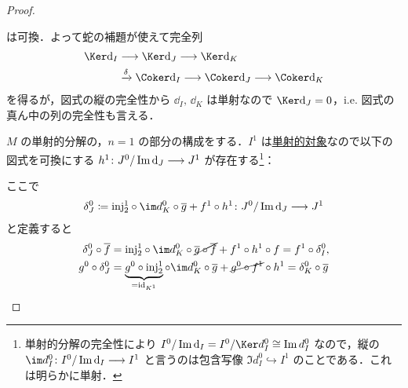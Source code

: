 \documentclass[algtopo_main]{subfiles}
\begin{document}
\begin{proof}
\begin{center}
    \end{center}
    は可換．よって蛇の補題が使えて完全列
    \begin{align}
        \Ker \dd_I &\lto \Ker \dd_J \lto \Ker \dd_K \\
        &\xrightarrow{\delta} \Coker \dd_I \lto \Coker \dd_J \lto \Coker \dd_K
    \end{align}
    を得るが，図式の縦の完全性から $\dd_I,\, \dd_K$ は単射なので $\Ker \dd_J = 0$，i.e. 図式の真ん中の列の完全性も言える．

    $M$ の単射的分解の，$n=1$ の部分の構成をする．$I^1$ は\hyperref[def:inj-mod]{単射的対象}なので以下の図式を可換にする $h^1 \colon J^0/\Im \dd_J \longrightarrow J^1$ が存在する\footnote{単射的分解の完全性により $I^0 / \Im \dd_I = I^0 / \Ker d_I^0 \cong \Im d_I^0$ なので，縦の $\im d_I^0 \colon I^0 / \Im \dd_I \lto I^1$ と言うのは包含写像 $\Im d_I^0 \hookrightarrow I^1$ のことである．これは明らかに単射．}：
    \begin{center}
    \end{center}
    ここで
    \begin{align}
        \delta^0_J \coloneqq \mathrm{inj}_2^1 \circ \im d_K^0 \circ \overline{g} + f^1 \circ h^1 \colon J^0 / \Im \dd_J \lto J^1
    \end{align}
    と定義すると
    \begin{align}
        \delta^0_J \circ \overline{f} &= \mathrm{inj}_2^1 \circ \im d_K^0 \circ \cancel{\overline{g} \circ \overline{f}} + f^1 \circ h^1 \circ f = f^1 \circ \delta_I^0, \\
        g^0 \circ \delta^0_J &= \underbrace{g^0 \circ \mathrm{inj}_2^1}_{= \mathrm{id}_{K^1}} \circ \im d_K^0 \circ \overline{g} + \cancel{g^0 \circ f^1} \circ h^1 = \delta_K^0 \circ \overline{g}
    \end{align}

\end{proof}
\end{document}
